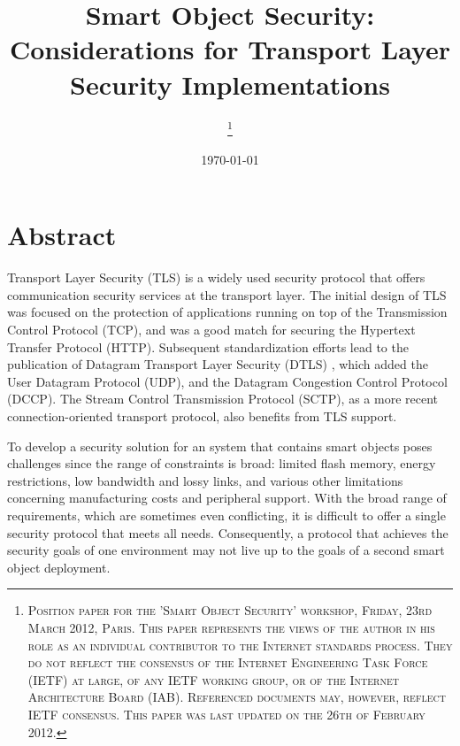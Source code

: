 \documentclass[a4paper, 10pt]{IEEEtran}
\begin{document}
\title{Smart Object Security: Considerations for Transport Layer Security Implementations}

\author{
\thanks{\textsc{
Position paper for the 'Smart Object Security' workshop, Friday, 23rd March 2012, Paris. This paper represents the views of the author in his role as an individual contributor to the Internet standards process. They do not reflect the consensus of the Internet Engineering Task Force (IETF) at large, of any IETF working group, or of the Internet Architecture Board (IAB). Referenced documents may, however, reflect IETF consensus. This paper was last updated on the 26th of February 2012.}}
}

\date{\today}

\maketitle

\section{Abstract}

Transport Layer Security (TLS) is a widely used security protocol that offers communication security services at the transport layer. The initial design of TLS was focused on the protection of applications running on top of the Transmission Control Protocol (TCP), and was a good match for securing the Hypertext Transfer Protocol (HTTP). Subsequent standardization efforts lead to the publication of Datagram Transport Layer Security (DTLS) \cite{rfc4347}, which added the User Datagram Protocol (UDP), and the Datagram Congestion Control Protocol (DCCP). The Stream Control Transmission Protocol (SCTP), as a more recent connection-oriented transport protocol, also benefits from TLS support.

To develop a security solution for an system that contains smart objects poses challenges since the range of constraints is broad: limited flash memory, energy restrictions, low bandwidth and lossy links, and various other limitations concerning manufacturing costs and peripheral support. With the broad range of requirements, which are sometimes even conflicting, it is difficult to offer a single security protocol that meets all needs. Consequently, a protocol that achieves the security goals of one environment may not live up to the goals of a second smart object deployment. 
\end{document}

